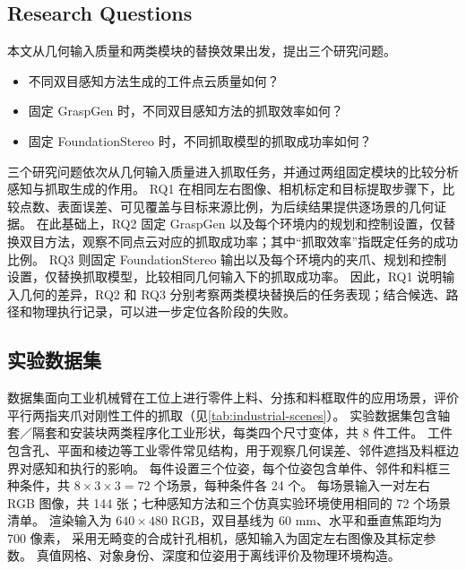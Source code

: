 \documentclass[UTF8,fontset=fandol,a4paper,11pt]{ctexart}
\newcommand{\qyb}[1]{\textcolor{red!75!black}{#1}}
\newcommand{\rqone}{不同双目感知方法生成的工件点云质量如何？}
\newcommand{\rqtwo}{固定 GraspGen 时，不同双目感知方法的抓取效率如何？}
\newcommand{\rqthree}{固定 FoundationStereo 时，不同抓取模型的抓取成功率如何？}
\begin{document}
\subsection{\qyb{Research Questions}}

本文从几何输入质量和两类模块的替换效果出发，提出三个研究问题。

\begin{itemize}[leftmargin=3.2em,itemsep=.6em]
\item[RQ1.] \rqone
\item[RQ2.] \rqtwo
\item[RQ3.] \rqthree
\end{itemize}

三个研究问题依次从几何输入质量进入抓取任务，并通过两组固定模块的比较分析感知与抓取生成的作用。
RQ1 在相同左右图像、相机标定和目标提取步骤下，比较点数、表面误差、可见覆盖与目标来源比例，为后续结果提供逐场景的几何证据。
在此基础上，RQ2 固定 GraspGen 以及每个环境内的规划和控制设置，仅替换双目方法，观察不同点云对应的抓取成功率；其中“抓取效率”指既定任务的成功比例。
RQ3 则固定 FoundationStereo 输出以及每个环境内的夹爪、规划和控制设置，仅替换抓取模型，比较相同几何输入下的抓取成功率。
因此，RQ1 说明输入几何的差异，RQ2 和 RQ3 分别考察两类模块替换后的任务表现；结合候选、路径和物理执行记录，可以进一步定位各阶段的失败。

\subsection{\qyb{实验数据集}}

数据集面向工业机械臂在工位上进行零件上料、分拣和料框取件的应用场景，评价平行两指夹爪对刚性工件的抓取（见\cref{tab:industrial-scenes}）。
实验数据集包含轴套／隔套和安装块两类程序化工业形状，每类四个尺寸变体，共 8 件工件。
工件包含孔、平面和棱边等工业零件常见结构，用于观察几何误差、邻件遮挡及料框边界对感知和执行的影响。
每件设置三个位姿，每个位姿包含单件、邻件和料框三种条件，共 $8\times3\times3=72$ 个场景，每种条件各 24 个。
每场景输入一对左右 RGB 图像，共 144 张；七种感知方法和三个仿真实验环境使用相同的 72 个场景清单。
渲染输入为 $640\times480$ RGB，双目基线为 60 mm、水平和垂直焦距均为 700 像素，
采用无畸变的合成针孔相机，感知输入为固定左右图像及其标定参数。
真值网格、对象身份、深度和位姿用于离线评价及物理环境构造。
\end{document}
